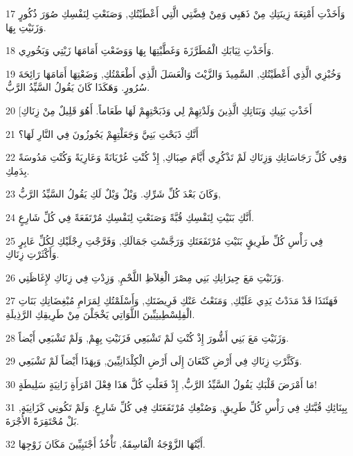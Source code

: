 \par 17 وَأَخَذْتِ أَمْتِعَةَ زِينَتِكِ مِنْ ذَهَبِي وَمِنْ فِضَّتِي الَّتِي أَعْطَيْتُكِ, وَصَنَعْتِ لِنَفْسِكِ صُوَرَ ذُكُورٍ وَزَنَيْتِ بِهَا.
\par 18 وَأَخَذْتِ ثِيَابَكِ الْمُطَرَّزَةَ وَغَطَّيْتِهَا بِهَا وَوَضَعْتِ أَمَامَهَا زَيْتِي وَبَخُورِي.
\par 19 وَخُبْزِي الَّذِي أَعْطَيْتُكِ, السَّمِيذَ وَالزَّيْتَ وَالْعَسَلَ الَّذِي أَطْعَمْتُكِ, وَضَعْتِهَا أَمَامَهَا رَائِحَةَ سُرُورٍ. وَهَكَذَا كَانَ يَقُولُ السَّيِّدُ الرَّبُّ.
\par 20 [أَخَذْتِ بَنِيكِ وَبَنَاتِكِ الَّذِينَ وَلَدْتِهِمْ لِي وَذَبَحْتِهِمْ لَهَا طَعَاماً. أَهُوَ قَلِيلٌ مِنْ زِنَاكِ
\par 21 أَنَّكِ ذَبَحْتِ بَنِيَّ وَجَعَلْتِهِمْ يَجُوزُونَ فِي النَّارِ لَهَا؟
\par 22 وَفِي كُلِّ رَجَاسَاتِكِ وَزِنَاكِ لَمْ تَذْكُرِي أَيَّامَ صِبَاكِ, إِذْ كُنْتِ عُرْيَانَةً وَعَارِيَةً وَكُنْتِ مَدُوسَةً بِدَمِكِ.
\par 23 وَكَانَ بَعْدَ كُلِّ شَرِّكِ. وَيْلٌ وَيْلٌ لَكِ يَقُولُ السَّيِّدُ الرَّبُّ,
\par 24 أَنَّكِ بَنَيْتِ لِنَفْسِكِ قُبَّةً وَصَنَعْتِ لِنَفْسِكِ مُرْتَفَعَةً فِي كُلِّ شَارِعٍ.
\par 25 فِي رَأْسِ كُلِّ طَرِيقٍ بَنَيْتِ مُرْتَفَعَتَكِ وَرَجَّسْتِ جَمَالَكِ, وَفَرَّجْتِ رِجْلَيْكِ لِكُلِّ عَابِرٍ وَأَكْثَرْتِ زِنَاكِ.
\par 26 وَزَنَيْتِ مَعَ جِيرَانِكِ بَنِي مِصْرَ الْغِلاَظِ اللَّحْمِ, وَزِدْتِ فِي زِنَاكِ لإِغَاظَتِي.
\par 27 فَهَئَنَذَا قَدْ مَدَدْتُ يَدِي عَلَيْكِ, وَمَنَعْتُ عَنْكِ فَرِيضَتَكِ, وَأَسْلَمْتُكِ لِمَرَامِ مُبْغِضَاتِكِ بَنَاتِ الْفِلِسْطِينِيِّينَ اللَّوَاتِي يَخْجَلْنَ مِنْ طَرِيقِكِ الرَّذِيلَةِ.
\par 28 وَزَنَيْتِ مَعَ بَنِي أَشُّورَ إِذْ كُنْتِ لَمْ تَشْبَعِي فَزَنَيْتِ بِهِمْ, وَلَمْ تَشْبَعِي أَيْضاً.
\par 29 وَكَثَّرْتِ زِنَاكِ فِي أَرْضِ كَنْعَانَ إِلَى أَرْضِ الْكِلْدَانِيِّينَ, وَبِهَذَا أَيْضاً لَمْ تَشْبَعِي.
\par 30 مَا أَمْرَضَ قَلْبَكِ يَقُولُ السَّيِّدُ الرَّبُّ, إِذْ فَعَلْتِ كُلَّ هَذَا فِعْلَ امْرَأَةٍ زَانِيَةٍ سَلِيطَةٍ!
\par 31 بِبِنَائِكِ قُبَّتَكِ فِي رَأْسِ كُلِّ طَرِيقٍ, وَصُنْعِكِ مُرْتَفَعَتَكِ فِي كُلِّ شَارِعٍ. وَلَمْ تَكُونِي كَزَانِيَةٍ, بَلْ مُحْتَقِرَةً الأُجْرَةَ.
\par 32 أَيَّتُهَا الزَّوْجَةُ الْفَاسِقَةُ, تَأْخُذُ أَجْنَبِيِّينَ مَكَانَ زَوْجِهَا.
